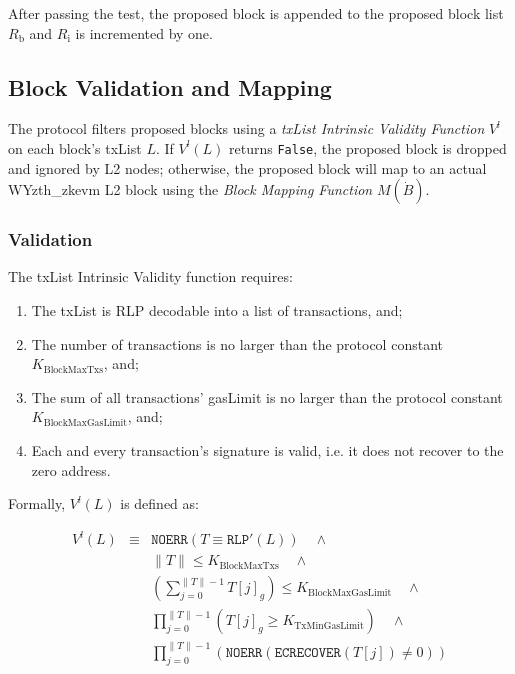 \documentclass[9pt,oneside]{amsart}
\begin{document}
\begin{multicols}{2}
After passing the test, the proposed block is appended to the proposed block list $R_\mathrm{b}$ and $R_\mathrm{i}$ is incremented by one.

\subsection{Block Validation and Mapping } \label{sec:filtermap}
The protocol filters proposed blocks using a \emph{txList Intrinsic Validity Function} $V^l$ on each block's txList $L$. If $V^l(L)$ returns \texttt{False}, the proposed block is dropped and ignored by L2 nodes; otherwise, the proposed block will map to an actual WYzth_zkevm L2 block using the \emph{Block Mapping Function} $M(\dot{B})$.

\subsubsection{Validation} The txList Intrinsic Validity function requires:

\begin{enumerate}
\item The txList is RLP decodable into a list of transactions, and;
\item The number of transactions is no larger than the protocol constant $ K_{\mathrm{BlockMaxTxs}}$, and;
\item The sum of all transactions' gasLimit is no larger than the protocol constant $K_{\mathrm{BlockMaxGasLimit}}$, and;
\item Each and every transaction's signature is valid, i.e. it does not recover to the zero address.
\end{enumerate}

Formally, $V^l(L)$ is defined as:

\begin{eqnarray}
V^l(L) & \equiv & \texttt{NOERR}(T \equiv \texttt{RLP}'(L))  \quad \wedge  \\
\nonumber& & \lVert T \rVert \le K_{\mathrm{BlockMaxTxs}} \quad \wedge \\
\nonumber & & (\sum_{j = 0}^{\lVert T \rVert - 1}T[j]_g) \le K_{\mathrm{BlockMaxGasLimit}} \quad \wedge \\
\nonumber & & \prod_{j = 0}^{\lVert T \rVert - 1} (T[j]_g \ge K_{\mathrm{TxMinGasLimit}})\quad \wedge \\
\nonumber & & \prod_{j = 0}^{\lVert T \rVert - 1} (\texttt{NOERR}(\texttt{ECRECOVER}(T[j]) \ne 0) )
\end{eqnarray}


\end{multicols}
\end{document}
